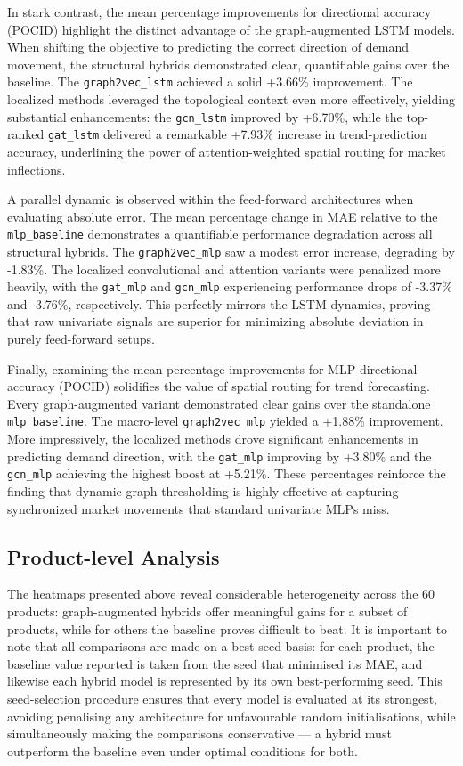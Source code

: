 In stark contrast, the mean percentage improvements for directional accuracy (POCID) highlight the distinct advantage of the graph-augmented LSTM models. When shifting the objective to predicting the correct direction of demand movement, the structural hybrids demonstrated clear, quantifiable gains over the baseline. The \texttt{graph2vec\_lstm} achieved a solid +3.66\% improvement. The localized methods leveraged the topological context even more effectively, yielding substantial enhancements: the \texttt{gcn\_lstm} improved by +6.70\%, while the top-ranked \texttt{gat\_lstm} delivered a remarkable +7.93\% increase in trend-prediction accuracy, underlining the power of attention-weighted spatial routing for market inflections.

A parallel dynamic is observed within the feed-forward architectures when evaluating absolute error. The mean percentage change in MAE relative to the \texttt{mlp\_baseline} demonstrates a quantifiable performance degradation across all structural hybrids. The \texttt{graph2vec\_mlp} saw a modest error increase, degrading by -1.83\%. The localized convolutional and attention variants were penalized more heavily, with the \texttt{gat\_mlp} and \texttt{gcn\_mlp} experiencing performance drops of -3.37\% and -3.76\%, respectively. This perfectly mirrors the LSTM dynamics, proving that raw univariate signals are superior for minimizing absolute deviation in purely feed-forward setups.

Finally, examining the mean percentage improvements for MLP directional accuracy (POCID) solidifies the value of spatial routing for trend forecasting. Every graph-augmented variant demonstrated clear gains over the standalone \texttt{mlp\_baseline}. The macro-level \texttt{graph2vec\_mlp} yielded a +1.88\% improvement. More impressively, the localized methods drove significant enhancements in predicting demand direction, with the \texttt{gat\_mlp} improving by +3.80\% and the \texttt{gcn\_mlp} achieving the highest boost at +5.21\%. These percentages reinforce the finding that dynamic graph thresholding is highly effective at capturing synchronized market movements that standard univariate MLPs miss.

\subsection{Product-level Analysis}
The heatmaps presented above reveal considerable heterogeneity across the 60 products: 
graph-augmented hybrids offer meaningful gains for a subset of products, while for 
others the baseline proves difficult to beat.
It is important to note that all comparisons are made on a best-seed basis: for each 
product, the baseline value reported is taken from the seed that minimised its MAE, 
and likewise each hybrid model is represented by its own best-performing seed. 
This seed-selection procedure ensures that every model is evaluated at its strongest, 
avoiding penalising any architecture for unfavourable random initialisations, while 
simultaneously making the comparisons conservative — a hybrid must outperform the 
baseline even under optimal conditions for both.

